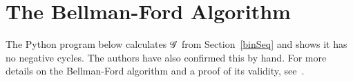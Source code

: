 \appendix
\section{The Bellman-Ford Algorithm} \label{bfAlg}
The Python program below calculates $\mathscr{G}$ from Section~\ref{binSeq} and shows it
has no negative cycles. The authors have also confirmed this by hand. For more
details on the Bellman-Ford algorithm and a proof of its validity,
see~\cite{bellmanford}.\\

\SMALL

